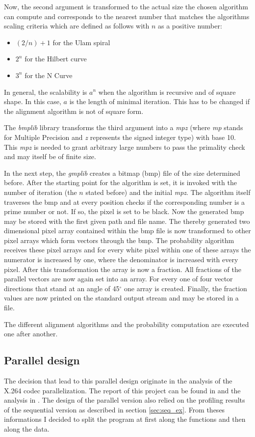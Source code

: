 Now, the second argument is transformed to the actual size the chosen algorithm can compute and corresponds to the nearest number that matches the algorithms scaling criteria which are defined as follows with $n$ as a positive number:
\begin{itemize}
   \item $(2/n)+1$ for the Ulam spiral
   \item $2^n$ for the Hilbert curve
   \item $3^n$ for the N Curve
\end{itemize}
In general, the scalability is $a^n$ when the algorithm is recursive and of square shape. In this case, $a$ is the length of minimal iteration. This has to be changed if the alignment algorithm is not of square form.

The \emph{bmplib} library transforms the third argument into a \emph{mpz} (where \emph{mp} stands for Multiple Precision and \emph{z} represents the signed integer type) with base 10. This \emph{mpz} is needed to grant arbitrary large numbers to pass the primality check and may itself be of finite size.

In the next step, the \emph{gmplib} creates a bitmap (bmp) file of the size determined before. After the starting point for the algorithm is set, it is invoked with the number of iteration (the $n$ stated before) and the initial \emph{mpz}. The algorithm itself traverses the bmp and at every position checks if the corresponding number is a prime number or not. If so, the pixel is set to be black.
Now the generated bmp may be stored with the first given path and file name.
The thereby generated two dimensional pixel array contained within the bmp file is now transformed to other pixel arrays which form vectors through the bmp. The probability algorithm receives these pixel arrays and for every white pixel within one of these arrays the numerator is increased by one, where the denominator is increased with every pixel. After this transformation the array is now a fraction. All fractions of the parallel vectors are now again set into an array. For every one of four vector directions that stand at an angle of 45$^\circ$ one array is created. Finally, the fraction values are now printed on the standard output stream and may be stored in a file.

The different alignment algorithms and the probability computation are executed one after another.

\subsection{Parallel design}
\label{sec:paralleldesign}
The decision that lead to this parallel design originate in the analysis of the X.264 codec parallelization. The report of this project can be found in \cite{BS08} and the analysis in \cite{self}. The design of the parallel version also relied on the profiling results of the sequential version as described in section \ref{sec:seq_ex}. From theses informations I decided to split the program at first along the functions and then along the data.

